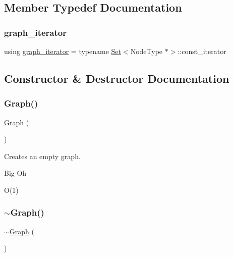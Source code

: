 \subsection{Member Typedef Documentation}
\mbox{\label{classGraph_a695969c31e87f9e8319d74e5ca39024b}} 
\subsubsection{\texorpdfstring{graph\+\_\+iterator}{graph\_iterator}}
{\footnotesize\ttfamily using \mbox{\hyperlink{classGraph_a695969c31e87f9e8319d74e5ca39024b}{graph\+\_\+iterator}} =  typename \mbox{\hyperlink{classstanfordcpplib_1_1collections_1_1GenericSet}{Set}}$<$Node\+Type $\ast$$>$\+::const\+\_\+iterator}



\subsection{Constructor \& Destructor Documentation}
\mbox{\label{classGraph_a0c40af42cad207665228815f0359bbd3}} 
\subsubsection{\texorpdfstring{Graph()}{Graph()}}
{\footnotesize\ttfamily \mbox{\hyperlink{classGraph}{Graph}} (\begin{DoxyParamCaption}{ }\end{DoxyParamCaption})\hspace{0.3cm}{\ttfamily [default]}}



Creates an empty graph. 

\begin{DoxyRefDesc}{Big-\/\+Oh}
\item[\mbox{\hyperlink{BigOh__BigOh000040}{Big-\/\+Oh}}]O(1) \end{DoxyRefDesc}
\mbox{\label{classGraph_af5a604e5e9e4d68dbc10b312e59f678f}} 
\subsubsection{\texorpdfstring{$\sim$\+Graph()}{~Graph()}}
{\footnotesize\ttfamily $\sim$\mbox{\hyperlink{classGraph}{Graph}} (\begin{DoxyParamCaption}{ }\end{DoxyParamCaption})\hspace{0.3cm}{\ttfamily [virtual]}}



